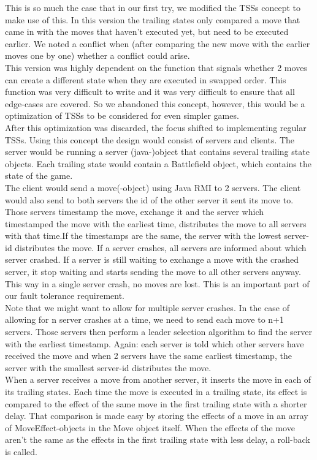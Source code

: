 This is so much the case that in our first try, we modified the TSSs concept to make use of this. In this version the trailing states only compared a move that came in with the moves that haven't executed yet, but need to be executed earlier. We noted a conflict when (after comparing the new move with the earlier moves one by one) whether a conflict could arise.\\
This version was highly dependent on the function that signals whether 2 moves can create a different state when they are executed in swapped order. This function was very difficult to write and it was very difficult to ensure that all edge-cases are covered. So we abandoned this concept, however, this would be a optimization of TSSs to be considered for even simpler games.\\
After this optimization was discarded, the focus shifted to implementing regular TSSs. Using this concept the design would consist of servers and clients. The server would be running a server (java-)object that contains several trailing state objects. Each trailing state would contain a Battlefield object, which contains the state of the game.\\
The client would send a move(-object) using Java RMI to 2 servers. The client would also send to both servers the id of the other server it sent its move to. Those servers timestamp the move, exchange it and the server which timestamped the move with the earliest time, distributes the move to all servers with that time.If the timestamps are the same, the server with the lowest server-id distributes the move. If a server crashes, all servers are informed about which server crashed. If a server is still waiting to exchange a move with the crashed server, it stop waiting and starts sending the move to all other servers anyway. This way in a single server crash, no moves are lost. This is an important part of our fault tolerance requirement. \\
Note that we might want to allow for multiple server crashes. In the case of allowing for n server crashes at a time, we need to send each move to n+1 servers. Those servers then perform a leader selection algorithm to find the server with the earliest timestamp. Again: each server is told which other servers have received the move and when 2 servers have the same earliest timestamp, the server with the smallest server-id distributes the move. \\
When a server receives a move from another server, it inserts the move in each of its trailing states. Each time the move is executed in a trailing state, its effect is compared to the effect of the same move in the first trailing state with a shorter delay. That comparison is made easy by storing the effects of a move in an array of MoveEffect-objects in the Move object itself. When the effects of the move aren't the same as the effects in the first trailing state with less delay, a roll-back is called.\\
